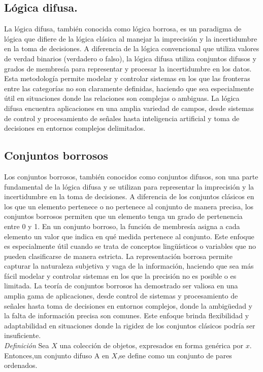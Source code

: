 \documentclass[a4paper, 12pt]{article}
\begin{document}
    \subsection{Lógica difusa.}
    La lógica difusa, también conocida como lógica borrosa, es un paradigma de lógica que difiere de la lógica clásica al manejar la imprecisión y la incertidumbre en la toma de decisiones. A diferencia de la lógica convencional que utiliza valores de verdad binarios (verdadero o falso), la lógica difusa utiliza conjuntos difusos y grados de membresía para representar y procesar la incertidumbre en los datos. Esta metodología permite modelar y controlar sistemas en los que las fronteras entre las categorías no son claramente definidas, haciendo que sea especialmente útil en situaciones donde las relaciones son complejas o ambiguas. La lógica difusa encuentra aplicaciones en una amplia variedad de campos, desde sistemas de control y procesamiento de señales hasta inteligencia artificial y toma de decisiones en entornos complejos delimitados. 

    \subsection{Conjuntos borrosos}
    Los conjuntos borrosos, también conocidos como conjuntos difusos, son una parte fundamental de la lógica difusa y se utilizan para representar la imprecisión y la incertidumbre en la toma de decisiones. A diferencia de los conjuntos clásicos en los que un elemento pertenece o no pertenece al conjunto de manera precisa, los conjuntos borrosos permiten que un elemento tenga un grado de pertenencia entre 0 y 1.
    En un conjunto borroso, la función de membresía asigna a cada elemento un valor que indica en qué medida pertenece al conjunto. Este enfoque es especialmente útil cuando se trata de conceptos lingüísticos o variables que no pueden clasificarse de manera estricta. La representación borrosa permite capturar la naturaleza subjetiva y vaga de la información, haciendo que sea más fácil modelar y controlar sistemas en los que la precisión no es posible o es limitada.
    La teoría de conjuntos borrosos ha demostrado ser valiosa en una amplia gama de aplicaciones, desde control de sistemas y procesamiento de señales hasta toma de decisiones en entornos complejos, donde la ambigüedad y la falta de información precisa son comunes. Este enfoque brinda flexibilidad y adaptabilidad en situaciones donde la rigidez de los conjuntos clásicos podría ser insuficiente.\\
    \emph{Definición}
    Sea $X$ una colección de objetos, expresados en forma genérica por $x$. Entonces,un conjunto difuso A en $X$,se define como un conjunto de pares ordenados.
\end{document}
